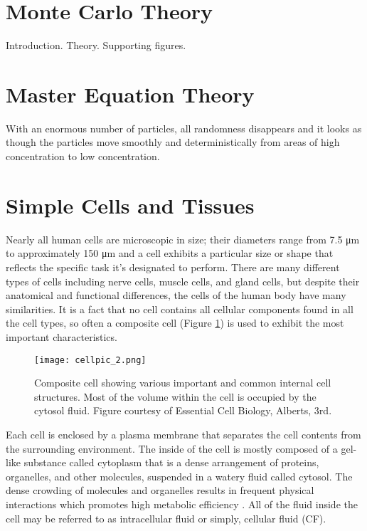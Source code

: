 \section{Monte Carlo Theory}
\label{sec:intro-mc}
	Introduction.
	Theory.
	Supporting figures.


\section{Master Equation Theory}
\label{sec:intro-me}
	With an enormous number of particles, all randomness disappears and it looks as though the particles move smoothly and deterministically from areas of high concentration to low concentration.

\section{Simple Cells and Tissues}
\label{sec:intro-cells}
	Nearly all human cells are microscopic in size; their diameters range from 7.5 \si{\micro\meter} to approximately 150 \si{\micro\meter} and a cell exhibits a particular size or shape that reflects the specific task it's designated to perform. There are many different types of cells including nerve cells, muscle cells, and gland cells, but despite their anatomical and functional differences, the cells of the human body have many similarities. It is a fact that no cell contains all cellular components found in all the cell types, so often a composite cell (Figure {\ref{fig:cellpic_2.png}}) is used to exhibit the most important characteristics. 

	\begin{figure}[h]
		\centering
		\texttt{[image: cellpic\_2.png]}
		\caption{Composite cell showing various important and common internal cell structures. Most of the volume within the cell is occupied by the cytosol fluid. Figure courtesy of Essential Cell Biology, Alberts, 3rd.}
		\label{fig:cellpic_2.png}
	\end{figure}

	Each cell is enclosed by a plasma membrane that separates the cell contents from the surrounding environment. The inside of the cell is mostly composed of a gel-like substance called cytoplasm that is a dense arrangement of proteins, organelles, and other molecules, suspended in a watery fluid called cytosol. The dense crowding of molecules and organelles results in frequent physical interactions which promotes high metabolic efficiency \citep{ap}. All of the fluid inside the cell may be referred to as intracellular fluid or simply, cellular fluid (CF).
	
